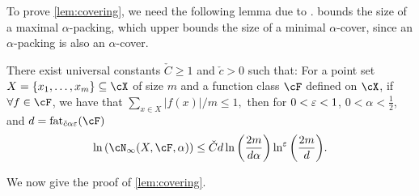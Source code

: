 To prove \cref{lem:covering}, we need the following lemma due to \cite{RudelsonVershynin}. \cite{RudelsonVershynin} bounds the size of a maximal $ \alpha$-packing, which upper bounds the size of a minimal $ \alpha $-cover, since an $ \alpha $-packing is also an $ \alpha $-cover.

\begin{theorem}\label{thm:infinitycoverrundelsonvershynin}
    There exist universal constants $ \check{C}\geq 1$ and $ \check{c} >0$ such that:  For a point set $ X=\{ x_{1},\ldots,x_{m} \}\subseteq \cX  $ of size $ m $ and a function class $ \cF $ defined on $ \cX$, if $ \forall f \in  \cF $, we have that $\sum_{x\in X} |f(x)|/m\leq 1,$ then for $ 0<\varepsilon<1 $, $ 0<\alpha<\frac{1}{2} $, and $ d=\fat_{\check{c}\alpha\eps}( \cF) $ 
    \begin{align*}
     \ln{\left( \cN_{\infty}(X, \cF ,\alpha)   \right)} \leq \check{C}d\ln{\left(\frac{2m}{d\alpha} \right)}\ln^{\eps}{\left(\frac{2m}{d} \right)}.
    \end{align*}        
    
\end{theorem}
We now give the proof of \cref{lem:covering}.

